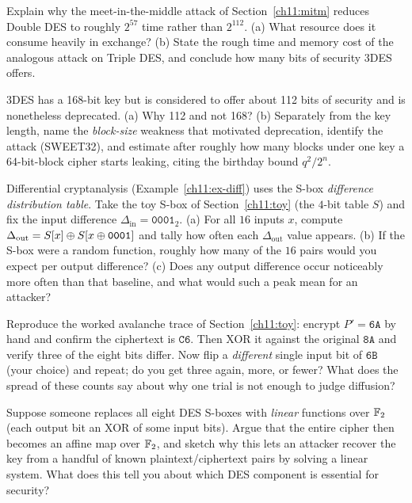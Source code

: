 \begin{exercise}
\label{ch11:ex-mitm}
Explain why the meet-in-the-middle attack of Section~\ref{ch11:mitm} reduces Double DES to roughly $2^{57}$ time rather than $2^{112}$. (a) What resource does it consume heavily in exchange? (b) State the rough time and memory cost of the analogous attack on Triple DES, and conclude how many bits of security 3DES offers.
\end{exercise}

\begin{exercise}
\label{ch11:ex-block-vs-key}
3DES has a 168-bit key but is considered to offer about 112 bits of security and is nonetheless deprecated. (a) Why 112 and not 168? (b) Separately from the key length, name the \emph{block-size} weakness that motivated deprecation, identify the attack (SWEET32), and estimate after roughly how many blocks under one key a 64-bit-block cipher starts leaking, citing the birthday bound $q^2/2^n$.
\end{exercise}

\begin{exercise}
\label{ch11:ex-diff-toy}
Differential cryptanalysis (Example~\ref{ch11:ex-diff}) uses the S-box \emph{difference distribution table}. Take the toy S-box of Section~\ref{ch11:toy} (the $4$-bit table $S$) and fix the input difference $\Delta_{\mathrm{in}} = \texttt{0001}_2$. (a) For all $16$ inputs $x$, compute $\Delta_{\mathrm{out}} = S[x]\oplus S[x\oplus\texttt{0001}]$ and tally how often each $\Delta_{\mathrm{out}}$ value appears. (b) If the S-box were a random function, roughly how many of the $16$ pairs would you expect per output difference? (c) Does any output difference occur noticeably more often than that baseline, and what would such a peak mean for an attacker?
\end{exercise}

\begin{exercise}
\label{ch11:ex-avalanche-trace}
Reproduce the worked avalanche trace of Section~\ref{ch11:toy}: encrypt $P' = \texttt{6A}$ by hand and confirm the ciphertext is $\texttt{C6}$. Then XOR it against the original $\texttt{8A}$ and verify three of the eight bits differ. Now flip a \emph{different} single input bit of $\texttt{6B}$ (your choice) and repeat; do you get three again, more, or fewer? What does the spread of these counts say about why one trial is not enough to judge diffusion?
\end{exercise}

\begin{exercise}
\label{ch11:ex-linearity}
Suppose someone replaces all eight DES S-boxes with \emph{linear} functions over $\mathbb{F}_2$ (each output bit an XOR of some input bits). Argue that the entire cipher then becomes an affine map over $\mathbb{F}_2$, and sketch why this lets an attacker recover the key from a handful of known plaintext/ciphertext pairs by solving a linear system. What does this tell you about which DES component is essential for security?
\end{exercise}
